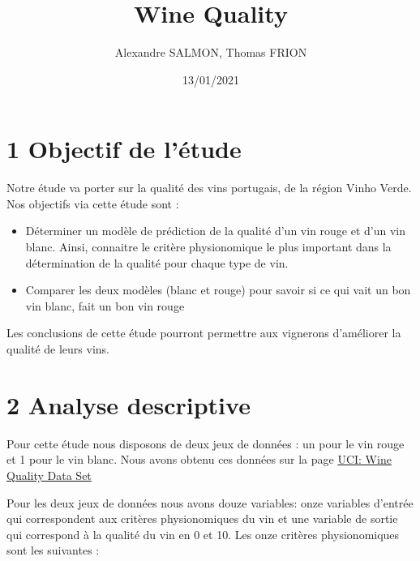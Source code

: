 \documentclass[]{article}
\title{Wine Quality}
\author{Alexandre SALMON, Thomas FRION}
\date{13/01/2021}
\providecommand{\tightlist}{%
  \setlength{\itemsep}{0pt}\setlength{\parskip}{0pt}}
\begin{document}
\maketitle

\hypertarget{objectif-de-luxe9tude}{%
\section{1 Objectif de l'étude}\label{objectif-de-luxe9tude}}

Notre étude va porter sur la qualité des vins portugais, de la région
Vinho Verde. Nos objectifs via cette étude sont :

\begin{itemize}
\tightlist
\item
  Déterminer un modèle de prédiction de la qualité d'un vin rouge et
  d'un vin blanc. Ainsi, connaitre le critère physionomique le plus
  important dans la détermination de la qualité pour chaque type de vin.
\item
  Comparer les deux modèles (blanc et rouge) pour savoir si ce qui vait
  un bon vin blanc, fait un bon vin rouge
\end{itemize}

Les conclusions de cette étude pourront permettre aux vignerons
d'améliorer la qualité de leurs vins.

\hypertarget{analyse-descriptive}{%
\section{2 Analyse descriptive}\label{analyse-descriptive}}

Pour cette étude nous disposons de deux jeux de données : un pour le vin
rouge et 1 pour le vin blanc. Nous avons obtenu ces données sur la page
\href{https://archive.ics.uci.edu/ml/datasets/Wine+Quality}{UCI: Wine
Quality Data Set}

Pour les deux jeux de données nous avons douze variables: onze variables
d'entrée qui correspondent aux critères physionomiques du vin et une
variable de sortie qui correspond à la qualité du vin en 0 et 10. Les
onze critères physionomiques sont les suivantes :
\end{document}
